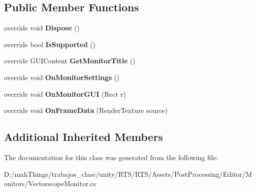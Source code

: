 \subsection*{Public Member Functions}
\begin{DoxyCompactItemize}
\item 
\mbox{\label{class_unity_editor_1_1_post_processing_1_1_vectorscope_monitor_a005eed06f524b178cf20c653a065e4b8}} 
override void {\bfseries Dispose} ()
\item 
\mbox{\label{class_unity_editor_1_1_post_processing_1_1_vectorscope_monitor_a463538bb61faf99a1507ac9501eb7de1}} 
override bool {\bfseries Is\+Supported} ()
\item 
\mbox{\label{class_unity_editor_1_1_post_processing_1_1_vectorscope_monitor_aaab4f236c863002855bf65f364e981ea}} 
override G\+U\+I\+Content {\bfseries Get\+Monitor\+Title} ()
\item 
\mbox{\label{class_unity_editor_1_1_post_processing_1_1_vectorscope_monitor_af640d93cb043401ba229796ac3803c1e}} 
override void {\bfseries On\+Monitor\+Settings} ()
\item 
\mbox{\label{class_unity_editor_1_1_post_processing_1_1_vectorscope_monitor_acb7862e8e86f2eb6cd33d8b2c89be22e}} 
override void {\bfseries On\+Monitor\+G\+UI} (Rect r)
\item 
\mbox{\label{class_unity_editor_1_1_post_processing_1_1_vectorscope_monitor_aad2a91361031b9b19ad81a7b72f9b695}} 
override void {\bfseries On\+Frame\+Data} (Render\+Texture source)
\end{DoxyCompactItemize}
\subsection*{Additional Inherited Members}


The documentation for this class was generated from the following file\+:\begin{DoxyCompactItemize}
\item 
D\+:/mah\+Things/trabajos\+\_\+clase/unity/\+R\+T\+S/\+R\+T\+S/\+Assets/\+Post\+Processing/\+Editor/\+Monitors/Vectorscope\+Monitor.\+cs\end{DoxyCompactItemize}
